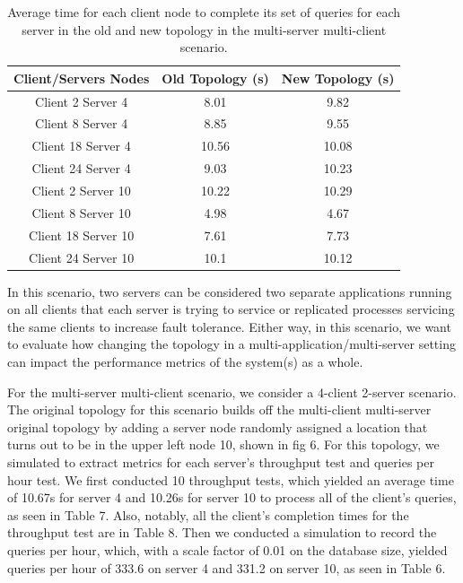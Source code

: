\begin{table}[h!]
\centering
\begin{tabular}{|c|c|c|}
\hline
Client/Servers Nodes & Old Topology (s) & New Topology (s) \\ \hline
Client 2 Server 4 & 8.01  & 9.82  \\ \hline
Client 8 Server 4 & 8.85  & 9.55  \\ \hline
Client 18 Server 4 & 10.56 & 10.08 \\ \hline
Client 24 Server 4 & 9.03  & 10.23 \\ \hline
Client 2 Server 10 & 10.22 & 10.29 \\ \hline
Client 8 Server 10 & 4.98  & 4.67  \\ \hline
Client 18 Server 10 & 7.61  & 7.73  \\ \hline
Client 24 Server 10 & 10.1  & 10.12 \\ \hline
\end{tabular}
\caption{Average time for each client node to complete its set of queries for each server in the old and new topology in the multi-server multi-client scenario.}
\label{tab:my_label}
\end{table}

In this scenario, two servers can be considered two separate applications running on all clients that each server is trying to service or replicated processes servicing the same clients to increase fault tolerance. Either way, in this scenario, we want to evaluate how changing the topology in a multi-application/multi-server setting can impact the performance metrics of the system(s) as a whole.

For the multi-server multi-client scenario, we consider a 4-client 2-server scenario. The original topology for this scenario builds off the multi-client multi-server original topology by adding a server node randomly assigned a location that turns out to be in the upper left node 10, shown in fig 6. For this topology, we simulated to extract metrics for each server's throughput test and queries per hour test. We first conducted 10 throughput tests, which yielded an average time of 10.67s for server 4 and 10.26s for server 10 to process all of the client's queries, as seen in Table 7.  Also, notably, all the client's completion times for the throughput test are in Table 8. Then we conducted a simulation to record the queries per hour, which, with a scale factor of 0.01 on the database size, yielded queries per hour of 333.6 on server 4 and 331.2 on server 10, as seen in Table 6.

